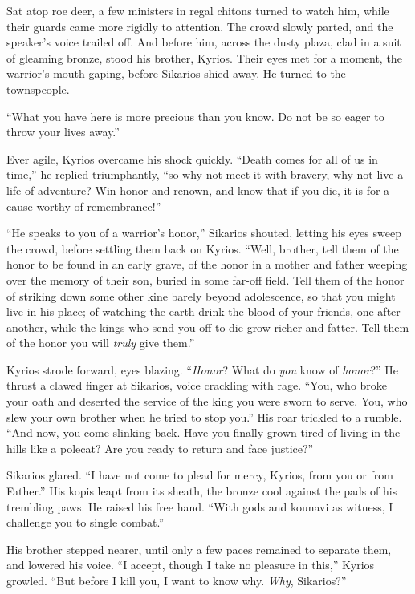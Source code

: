 Sat atop roe deer, a few ministers in regal chitons turned to watch him, while their guards came more rigidly to attention. The crowd slowly parted, and the speaker's voice trailed off. And before him, across the dusty plaza, clad in a suit of gleaming bronze, stood his brother, Kyrios. Their eyes met for a moment, the warrior's mouth gaping, before Sikarios shied away. He turned to the townspeople.

``What you have here is more precious than you know. Do not be so eager to throw your lives away.''

Ever agile, Kyrios overcame his shock quickly. ``Death comes for all of us in time,'' he replied triumphantly, ``so why not meet it with bravery, why not live a life of adventure? Win honor and renown, and know that if you die, it is for a cause worthy of remembrance!''

``He speaks to you of a warrior's honor,'' Sikarios shouted, letting his eyes sweep the crowd, before settling them back on Kyrios. ``Well, brother, tell them of the honor to be found in an early grave, of the honor in a mother and father weeping over the memory of their son, buried in some far-off field. Tell them of the honor of striking down some other kine barely beyond adolescence, so that you might live in his place; of watching the earth drink the blood of your friends, one after another, while the kings who send you off to die grow richer and fatter. Tell them of the honor you will \emph{truly} give them.''

Kyrios strode forward, eyes blazing. ``\emph{Honor}? What do \emph{you} know of \emph{honor}?'' He thrust a clawed finger at Sikarios, voice crackling with rage. ``You, who broke your oath and deserted the service of the king you were sworn to serve. You, who slew your own brother when he tried to stop you.'' His roar trickled to a rumble. ``And now, you come slinking back. Have you finally grown tired of living in the hills like a polecat? Are you ready to return and face justice?''

Sikarios glared. ``I have not come to plead for mercy, Kyrios, from you or from Father.'' His kopis leapt from its sheath, the bronze cool against the pads of his trembling paws. He raised his free hand. ``With gods and kounavi as witness, I challenge you to single combat.''

His brother stepped nearer, until only a few paces remained to separate them, and lowered his voice. ``I accept, though I take no pleasure in this,'' Kyrios growled. ``But before I kill you, I want to know why. \emph{Why}, Sikarios?''

